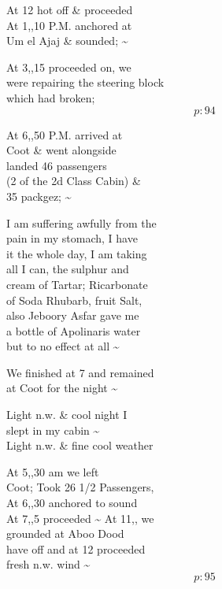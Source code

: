 \documentclass{report}
\begin{document}
	\par{
 	At 12 hot off \& proceeded\ \\At 1,,10 P.M. anchored at\ \\Um el Ajaj \& sounded; \~{}\ \\
	}

	\par{
 	At 3,,15 proceeded on, we\ \\were repairing the steering block\ \\which had broken;\ \\
  \[p: 94 \]

	}

	\par{
 	At 6,,50 P.M. arrived at\ \\Coot \& went alongside\ \\landed 46 passengers\ \\(2 of the 2d Class Cabin) \&\ \\35 packgez; \~{}\ \\
	}

	\par{
 	I am suffering awfully from the\ \\pain in my stomach, I have\ \\it the whole day, I am taking\ \\all I can, the sulphur and\ \\cream of Tartar; Ricarbonate\ \\of Soda Rhubarb, fruit Salt,\ \\also Jeboory Asfar gave me\ \\a bottle of Apolinaris water\ \\but to no effect at all \~{}\ \\
	}

	\par{
 	We finished at 7 and remained\ \\at Coot for the night \~{}\ \\
	}

	\par{
 	Light n.w. \& cool night I\ \\slept in my cabin \~{}\ \\Light n.w. \& fine cool weather\ \\
	}

	\par{
 	At 5,,30 am we left\ \\Coot; Took 26 1/2 Passengers,\ \\At 6,,30 anchored to sound\ \\At 7,,5 proceeded \~{} At 11,, we\ \\grounded at Aboo Dood\ \\have off and at 12 proceeded\ \\fresh n.w. wind \~{}\ \\
  \[p: 95 \]

	}
\end{document}
